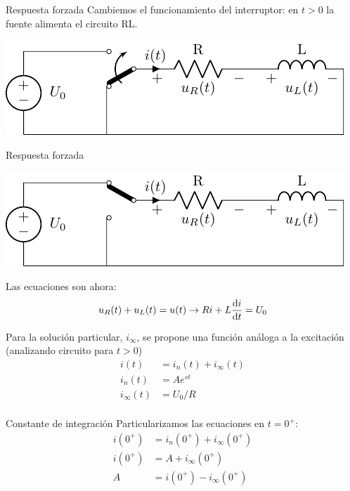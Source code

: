 \documentclass[aspectratio=169, xcolor={usenames,svgnames,dvipsnames}]{beamer}
\begin{document}
\begin{frame}[label={sec:orgf4970ab}]{Respuesta forzada}
Cambiemos el funcionamiento del interruptor: en \(t > 0\) la fuente alimenta el circuito RL.
\begin{center}
\includegraphics[width=.9\linewidth]{figs/transitorio_circuitoRL2.pdf}
\end{center}
\end{frame}

\begin{frame}[label={sec:org7866615}]{Respuesta forzada}
\begin{center}
\includegraphics[height=0.25\textheight]{figs/transitorio_circuitoRL2_t0+.pdf}
\end{center}
Las ecuaciones son ahora:
\[
  u_R(t) + u_L(t) = u(t) \rightarrow R i + L\diff{i}{t} = U_0
\]

Para la solución particular, \(i_\infty\), se propone una función análoga a la excitación (analizando circuito para \(t > 0\))
\begin{align*}
  i(t) &= i_n(t) + i_\infty(t)\\
  i_n(t) &= A e^{st}\\
  i_\infty(t) &= U_0/R\\
\end{align*}
\end{frame}

\begin{frame}[label={sec:org7a00d71}]{Constante de integración}
Particularizamos las ecuaciones en \(t = 0^+\):
\begin{align*}
  i(0^+) &= i_n(0^+) + i_\infty(0^+)\\
  i(0^+) &= A + i_\infty(0^+)\\
  A &= i(0^+) - i_\infty(0^+)
\end{align*}
\end{frame}
\end{document}
